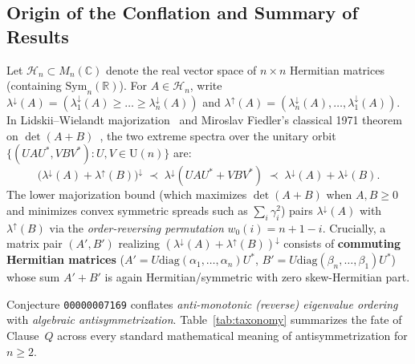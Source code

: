 \documentclass[11pt,a4paper]{article}
\theoremstyle{plain}
\theoremstyle{definition}
\newcommand{\C}{\mathbb{C}}
\newcommand{\R}{\mathbb{R}}
\newcommand{\diag}{\mathrm{diag}}
\newcommand{\Sym}{\mathrm{Sym}}
\newcommand{\Herm}{\mathcal{H}}
\begin{document}
\subsection{Origin of the Conflation and Summary of Results}
Let $\Herm_n \subset M_n(\C)$ denote the real vector space of $n \times n$ Hermitian matrices (containing $\Sym_n(\R)$). For $A \in \Herm_n$, write $\lambda^\downarrow(A) = (\lambda_1^\downarrow(A) \ge \dots \ge \lambda_n^\downarrow(A))$ and $\lambda^\uparrow(A) = (\lambda_n^\downarrow(A), \dots, \lambda_1^\downarrow(A))$. In Lidskii--Wielandt majorization~\cite{Lidskii1950,Wielandt1955} and Miroslav Fiedler's classical 1971 theorem on $\det(A + B)$~\cite{Fiedler1971}, the two extreme spectra over the unitary orbit $\{(U A U^*, V B V^*) : U, V \in \mathrm{U}(n)\}$ are:
\[
  \bigl(\lambda^\downarrow(A) + \lambda^\uparrow(B)\bigr)^\downarrow
  \;\prec\;
  \lambda^\downarrow(U A U^* + V B V^*)
  \;\prec\;
  \lambda^\downarrow(A) + \lambda^\downarrow(B).
\]
The lower majorization bound (which maximizes $\det(A + B)$ when $A, B \ge 0$ and minimizes convex symmetric spreads such as $\sum_i \gamma_i^2$) pairs $\lambda^\downarrow(A)$ with $\lambda^\uparrow(B)$ via the \emph{order-reversing permutation} $w_0(i) = n + 1 - i$. Crucially, a matrix pair $(A', B')$ realizing $(\lambda^\downarrow(A) + \lambda^\uparrow(B))^\downarrow$ consists of \textbf{commuting Hermitian matrices} ($A' = U \diag(\alpha_1,\dots,\alpha_n) U^*$, $B' = U \diag(\beta_n,\dots,\beta_1) U^*$) whose sum $A' + B'$ is again Hermitian/symmetric with zero skew-Hermitian part.

Conjecture \texttt{00000007169} conflates \emph{anti-monotonic (reverse) eigenvalue ordering} with \emph{algebraic antisymmetrization}. Table~\ref{tab:taxonomy} summarizes the fate of Clause~$Q$ across every standard mathematical meaning of antisymmetrization for $n \ge 2$.
\end{document}
